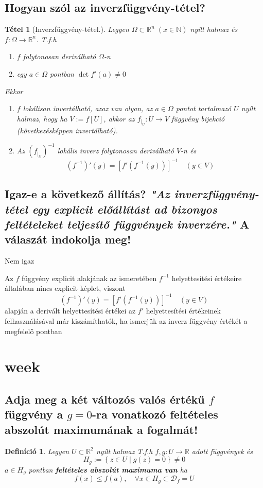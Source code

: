 \documentclass[12pt,a4paper]{article}
\newcommand{\R}{\mathbb{R}}
\newcommand{\N}{\mathbb{N}}
\newcommand{\CD}{\mathcal{D}}
\newcommand{\bb}[1]{\left( #1 \right)}
\newcommand{\braces}[1]{\left\lbrace #1 \right\rbrace}
\newtheorem{tet}{Tétel}[section]
\newtheorem{defi}{Definíció}[section]
\begin{document}
\subsection{Hogyan szól az inverzfüggvény-tétel?}
\begin{tet}[Inverzfüggvény-tétel.]
Legyen $\Omega \subset \R^n \; (x\in\N)$  nyílt halmaz és $f: \Omega \rightarrow \R^n$. T.f.h
\begin{enumerate}
\item[(a)] $f$ folytonosan deriválható $\Omega$-n
\item[(b)] egy $a \in \Omega$ pontban $\det f'(a) \neq 0$
\end{enumerate}
Ekkor
\begin{enumerate}
\item $f$ lokálisan invertálható, azaz van olyan, az $a \in \Omega$ pontot tartalmazó $U$ nyílt halmaz, hogy ha $V := f[U]$, akkor az $f_{\mid_U} : U \rightarrow V$ függvény bijekció (következésképpen invertálható).
\item Az $\bb{f_{\mid_U}}^{-1}$ 
lokális inverz folytonosan deriválható $V$-n és
\[
\bb{f^{-1}}'(y) = \left[ f'(f^{-1}(y)) \right]^{-1} \quad (y \in V)
\]
\end{enumerate}
\end{tet}
\subsection{Igaz-e a következő állítás? \textit{"Az inverzfüggvény-tétel egy explicit előállítást ad bizonyos feltételeket teljesítő függvények inverzére."} A válaszát indokolja meg!}
Nem igaz

Az $f$ függvény explicit alakjának az ismeretében $f^{-1}$ helyettesítési értékeire általában nincs explicit képlet, viszont
\[
\bb{f^{-1}}'(y) = \left[ f'(f^{-1}(y)) \right]^{-1} \quad (y \in V)
\]
alapján a derivált helyettesítési értékei az $f'$ helyettesítési értékeinek felhasználásával már kiszámíthatók, ha ismerjük az inverz függvény értékét a megfelelő pontban
\newpage
\section{week}
\subsection{ Adja meg a két változós valós értékű $f$ függvény a $g = 0$-ra vonatkozó feltételes abszolút maximumának a fogalmát!}
\begin{defi}
Legyen $U \subset \R^2$ nyílt halmaz T.f.h $f,g: U \rightarrow \R $ adott függvények és
\[
H_g := \braces{z\in U \mid g(z) = 0} \neq 0
\]
$a \in H_g$ pontban \textbf{feltételes abszolút maximuma van} ha
\[
f(x) \leq f(a), \quad \forall x \in H_g \subset \CD_f = U
\]
\end{defi}
\end{document}
